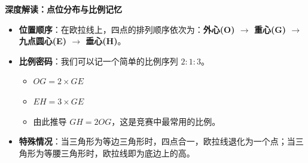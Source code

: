 \begin{explanationbox}
\textbf{深度解读：点位分布与比例记忆}
\begin{itemize}
    \item \textbf{位置顺序}：在欧拉线上，四点的排列顺序依次为：\textbf{外心(O) $\to$ 重心(G) $\to$ 九点圆心(E) $\to$ 垂心(H)}。
    \item \textbf{比例密码}：我们可以记一个简单的比例序列 $2:1:3$。
    \begin{itemize}
        \item $OG = 2 \times GE$
        \item $EH = 3 \times GE$
        \item 由此推导 $GH = 2OG$，这是竞赛中最常用的比例。
    \end{itemize}
    \item \textbf{特殊情况}：当三角形为等边三角形时，四点合一，欧拉线退化为一个点；当三角形为等腰三角形时，欧拉线即为底边上的高。
\end{itemize}
\end{explanationbox}